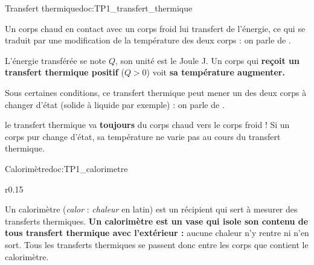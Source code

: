\begin{doc}{Transfert thermique}{doc:TP1_transfert_thermique}
  \begin{importants}
    Un corps chaud en contact avec un corps froid lui transfert de l'énergie, ce qui se traduit par une modification de la température des deux corps : on parle de .
  \end{importants}
  L'énergie transférée se note $Q$, son unité est le Joule \unit{\joule}.
  Un corps qui \textbf{reçoit un transfert thermique positif} ($Q > 0$) voit \textbf{sa température augmenter.}
  
  \begin{importants}
    Sous certaines conditions, ce transfert thermique peut mener un des deux corps à changer d'état (solide à liquide par exemple) : on parle de .
  \end{importants}
  \attention le transfert thermique va \textbf{toujours} du corps chaud vers le corps froid !
  Si un corps pur change d'état, sa température ne varie pas au cours du transfert thermique.
\end{doc}

\begin{doc}{Calorimètre}{doc:TP1_calorimetre}
  \begin{wrapfigure}{r}{0.15\linewidth}
    \centering
    \vspace*{-8pt}
  \end{wrapfigure}
  
  Un calorimètre (\og \textit{calor} \fg : \textit{chaleur} en latin) est un récipient qui sert à mesurer des transferts thermiques.
  \textbf{Un calorimètre est un vase qui isole son contenu de tous transfert thermique avec l'extérieur :} aucune chaleur n'y rentre ni n'en sort.
  Tous les transferts thermiques se passent donc entre les corps que contient le calorimètre.
\end{doc}

